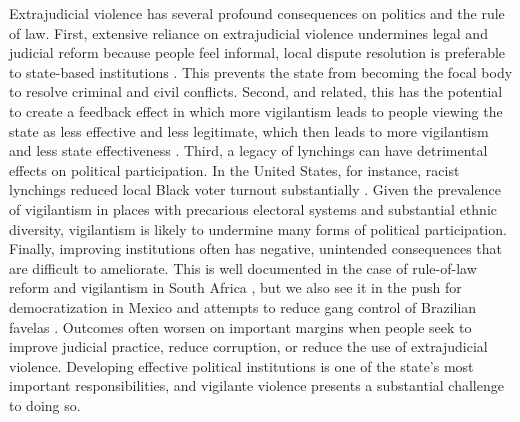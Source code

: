 \documentclass[12pt,ansiapaper]{article}
\begin{document}
Extrajudicial violence has several profound consequences on politics and the rule of law. First, extensive reliance on extrajudicial violence undermines legal and judicial reform because people feel informal, local dispute resolution is preferable to state-based institutions \citep{blair2020peacekeeping}. This prevents the state from becoming the focal body to resolve criminal and civil conflicts. Second, and related, this has the potential to create a feedback effect in which more vigilantism leads to people viewing the state as less effective and less legitimate, which then leads to more vigilantism and less state effectiveness \citep{jung2020lynching}. Third, a legacy of lynchings can have detrimental effects on political participation. In the United States, for instance, racist lynchings reduced local Black voter turnout substantially \citep{jones2017political}. Given the prevalence of vigilantism in places with precarious electoral systems and substantial ethnic diversity, vigilantism is likely to undermine many forms of political participation. Finally, improving institutions often has negative, unintended consequences that are difficult to ameliorate. This is well documented in the case of rule-of-law reform and vigilantism in South Africa \citep{smith2019contradictions}, but we also see it in the push for democratization in Mexico \citep{trejo2021high} and attempts to reduce gang control of Brazilian favelas \citep{magaloni2020killing}. Outcomes often worsen on important margins when people seek to improve judicial practice, reduce corruption, or reduce the use of extrajudicial violence. Developing effective political institutions is one of the state's most important responsibilities, and vigilante violence presents a substantial challenge to doing so. 

\newpage

\setlength{\parindent}{0cm}
\setlength{\parskip}{5pt}


\end{document}

